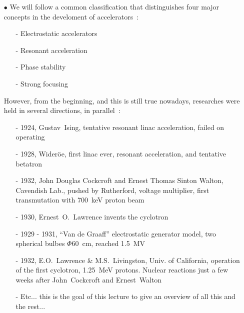 \documentclass[12pt]{article}
\newcommand{\nind}{\noindent}
\begin{document}
\begin{itemize}
  \item[$\bullet$]  We will follow a common classification that distinguishes four major concepts 
in the develoment of accelerators~: 
  \begin{itemize}
    \item[-] Electrostatic accelerators 
    \item[-] Resonant acceleration
    \item[-] Phase stability
    \item[-] Strong focusing
  \end{itemize}
\nind   However, from the beginning, and this is still true nowadays, 
researches were held in several directions, in parallel~: 
  \begin{itemize}
    \item[-] 1924, Gustav~Ising, tentative resonant linac acceleration, failed on operating
    \item[-] 1928, Wider\"{o}e, first linac ever, resonant  acceleration,  and tentative betatron
    \item[-] 1932,  John Douglas Cockcroft and Ernest Thomas Sinton Walton, 
Cavendish Lab., pushed by Rutherford, voltage multiplier, first transmutation with 700~keV proton beam
    \item[-] 1930, Ernest~O.~Lawrence invents the cyclotron 
    \item[-] 1929 - 1931, ``Van de Graaff'' electrostatic generator model, two 
spherical bulbes $\Phi$60~cm, reached 1.5~MV
    \item[-] 1932, E.O.~Lawrence \& M.S.~Livingston, Univ. of California, operation of the first cyclotron, 1.25~MeV protons. 
Nuclear reactions just a few weeks after John~Cockcroft and Ernest~Walton
    \item[-] Etc... this is the goal of this lecture to give an overview of all this and the rest...
  \end{itemize}
\end{itemize}
\end{document}
